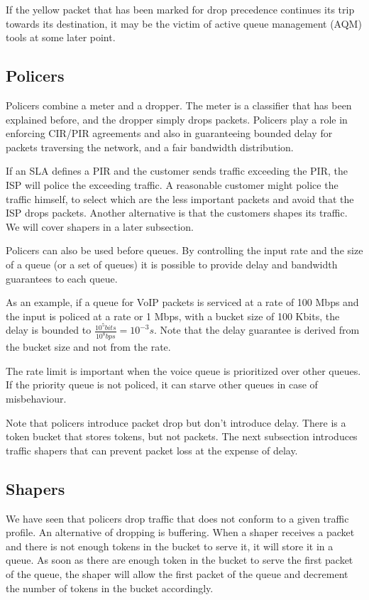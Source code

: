 If the yellow packet that has been marked for drop precedence continues its trip towards its destination, it may be the victim of active queue management (AQM) tools at some later point.

\subsection{Policers}

Policers combine a meter and a dropper.
The meter is a classifier that has been explained before, and the dropper simply drops packets.
Policers play a role in enforcing CIR/PIR agreements and also in guaranteeing bounded delay for packets traversing the network, and a fair bandwidth distribution.

If an SLA defines a PIR and the customer sends traffic exceeding the PIR, the ISP will police the exceeding traffic.
A reasonable customer might police the traffic himself, to select which are the less important packets and avoid that the ISP drops packets.
Another alternative is that the customers shapes its traffic.
We will cover shapers in a later subsection.

Policers can also be used before queues.
By controlling the input rate and the size of a queue (or a set of queues) it is possible to provide delay and bandwidth guarantees to each queue.

As an example, if a queue for VoIP packets is serviced at a rate of 100 Mbps and the input is policed at a rate or 1 Mbps, with a bucket size of 100 Kbits, the  delay is bounded to $\frac{10^5 bits}{10^8 bps} = 10^{-3}s$.
Note that the delay guarantee is derived from the bucket size and not from the rate.

The rate limit is important when the voice queue is prioritized over other queues.
If the priority queue is not policed, it can starve other queues in case of misbehaviour.

Note that policers introduce packet drop but don't introduce delay.
There is a token bucket that stores tokens, but not packets.
The next subsection introduces traffic shapers that can prevent packet loss at the expense of delay.

\subsection{Shapers}

We have seen that policers drop traffic that does not conform to a given traffic profile.
An alternative of dropping is buffering.
When a shaper receives a packet and there is not enough tokens in the bucket to serve it, it will store it in a queue.
As soon as there are enough token in the bucket to serve the first packet of the queue, the shaper will allow the first packet of the queue and decrement the number of tokens in the bucket accordingly.


